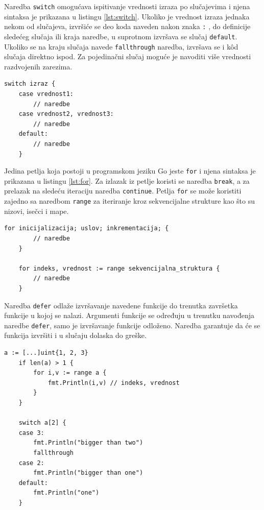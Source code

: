 \documentclass[12pt,oneside]{memoir}
\begin{document}
Naredba \texttt{switch} omogućava ispitivanje vrednosti izraza po slučajevima i njena sintaksa je prikazana u listingu \ref{lst:switch}. Ukoliko je vrednost izraza jednaka nekom od slučajeva, izvršiće se deo koda naveden nakon znaka \texttt{:} , do definicije sledećeg slučaja ili kraja naredbe, u suprotnom izvršava se slučaj \texttt{default}. Ukoliko se na kraju slučaja navede \texttt{fallthrough} naredba, izvršava se i k\^{o}d slučaja direktno ispod. Za pojedinačni slučaj moguće je navoditi više vrednosti razdvojenih zarezima. 

\begin{center}
\begin{lstlisting}[caption=Sintaksa naredbe \texttt{switch}, label={lst:switch},  backgroundcolor=\color{background}]
	switch izraz {
    case vrednost1:
        // naredbe
    case vrednost2, vrednost3:
       	// naredbe
    default:
      	// naredbe
    }
\end{lstlisting}
\end{center}


Jedina petlja koja postoji u programskom jeziku Go jeste \texttt{for} i njena sintaksa je prikazana u listingu \ref{lst:for}. Za izlazak iz petlje koristi se naredba \texttt{break}, a za prelazak na sledeću iteraciju naredba \texttt{continue}. Petlja \texttt{for} se može koristiti zajedno sa naredbom \texttt{range} za iteriranje kroz sekvencijalne strukture kao što su nizovi, isečci i mape. 

\begin{center}
\begin{lstlisting}[caption=Sintaksa \texttt{for} petlje, label={lst:for},  backgroundcolor=\color{background}]
	for inicijalizacija; uslov; inkrementacija; { 
		// naredbe
	}

	for indeks, vrednost := range sekvencijalna_struktura {
		// naredbe
	}
\end{lstlisting}
\end{center}


Naredba \texttt{defer} odlaže izvršavanje navedene funkcije do trenutka završetka funkcije u kojoj se nalazi. Argumenti funkcije se određuju u trenutku navođenja naredbe \texttt{defer}, samo je izvršavanje funkcije odloženo. Naredba garantuje da će se funkcija izvršiti i u slučaju dolaska do greške. 

\begin{center}
\begin{lstlisting}[caption=Primer koji demonstrira upotrebu kontrolnih struktura, label={lst:control},  backgroundcolor=\color{background}]
	a := [...]uint{1, 2, 3}
	if len(a) > 1 {
		for i,v := range a {	
			fmt.Println(i,v) // indeks, vrednost
		}
	}

	switch a[2] {
    case 3:
        fmt.Println("bigger than two")
		fallthrough
    case 2:
        fmt.Println("bigger than one")
    default:
        fmt.Println("one")
    }
\end{lstlisting}
\end{center}
\end{document}
